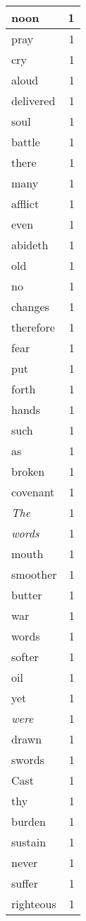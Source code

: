 \begin{center}
\begin{longtable}{l|r}
noon & 1 \\ \hline
pray & 1 \\ \hline
cry & 1 \\ \hline
aloud & 1 \\ \hline
delivered & 1 \\ \hline
soul & 1 \\ \hline
battle & 1 \\ \hline
there & 1 \\ \hline
many & 1 \\ \hline
afflict & 1 \\ \hline
even & 1 \\ \hline
abideth & 1 \\ \hline
old & 1 \\ \hline
no & 1 \\ \hline
changes & 1 \\ \hline
therefore & 1 \\ \hline
fear & 1 \\ \hline
put & 1 \\ \hline
forth & 1 \\ \hline
hands & 1 \\ \hline
such & 1 \\ \hline
as & 1 \\ \hline
broken & 1 \\ \hline
covenant & 1 \\ \hline
\emph{The} & 1 \\ \hline
\emph{words} & 1 \\ \hline
mouth & 1 \\ \hline
smoother & 1 \\ \hline
butter & 1 \\ \hline
war & 1 \\ \hline
words & 1 \\ \hline
softer & 1 \\ \hline
oil & 1 \\ \hline
yet & 1 \\ \hline
\emph{were} & 1 \\ \hline
drawn & 1 \\ \hline
swords & 1 \\ \hline
Cast & 1 \\ \hline
thy & 1 \\ \hline
burden & 1 \\ \hline
sustain & 1 \\ \hline
never & 1 \\ \hline
suffer & 1 \\ \hline
righteous & 1 \\ \hline

\end{longtable}
\end{center}
